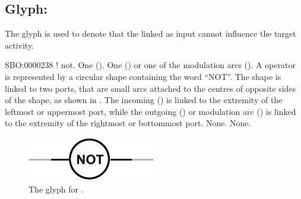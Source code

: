 \subsection{Glyph: }
\label{sec:af:not}

The glyph  is used to denote that the  linked as input cannot influence the target activity.

\begin{glyphDescription}
 \glyphSboTerm SBO:0000238 ! not.
 \glyphIncoming One  ().
 \glyphOutgoing  One  () or one of the modulation arcs ().
 \glyphContainer A  operator is represented by a circular shape containing the word ``NOT''.
The shape is linked to two ports, that are small arcs attached to the centres of opposite sides of the shape, as shown in .
The incoming  () is linked to the extremity of the leftmost or uppermost port, while the outgoing  () or modulation arc () is linked to the extremity of the rightmost or bottommost port.
 \glyphLabel None.
 \glyphAux None.
 \end{glyphDescription}

\begin{figure}[H]
  \centering
  \includegraphics[scale = 1]{images/build/not.pdf}
  \caption{The \AF glyph for .}
  \label{fig:af:not}
\end{figure}
